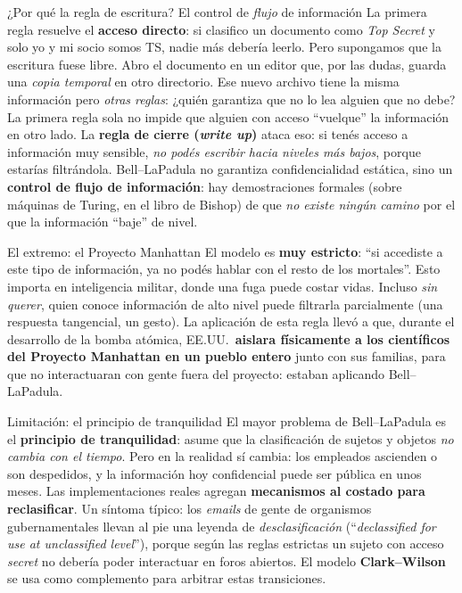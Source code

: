 \documentclass[11pt,a4paper]{article}
\begin{document}
\begin{anecbox}{¿Por qué la regla de escritura? El control de \emph{flujo} de información}
La primera regla resuelve el \textbf{acceso directo}: si clasifico un documento como
\emph{Top Secret} y solo yo y mi socio somos TS, nadie más debería leerlo. Pero supongamos
que la escritura fuese libre. Abro el documento en un editor que, por las dudas, guarda una
\emph{copia temporal} en otro directorio. Ese nuevo archivo tiene la misma información pero
\emph{otras reglas}: ¿quién garantiza que no lo lea alguien que no debe? La primera regla
sola no impide que alguien con acceso ``vuelque'' la información en otro lado. La
\textbf{regla de cierre (\emph{write up})} ataca eso: si tenés acceso a información muy
sensible, \emph{no podés escribir hacia niveles más bajos}, porque estarías filtrándola.
Bell--LaPadula no garantiza confidencialidad estática, sino un \textbf{control de flujo de
información}: hay demostraciones formales (sobre máquinas de Turing, en el libro de Bishop)
de que \emph{no existe ningún camino} por el que la información ``baje'' de nivel.
\end{anecbox}

\begin{anecbox}{El extremo: el Proyecto Manhattan}
El modelo es \textbf{muy estricto}: ``si accediste a este tipo de información, ya no podés
hablar con el resto de los mortales''. Esto importa en inteligencia militar, donde una fuga
puede costar vidas. Incluso \emph{sin querer}, quien conoce información de alto nivel puede
filtrarla parcialmente (una respuesta tangencial, un gesto). La aplicación de esta regla llevó
a que, durante el desarrollo de la bomba atómica, EE.UU.\ \textbf{aislara físicamente a los
científicos del Proyecto Manhattan en un pueblo entero} junto con sus familias, para que no
interactuaran con gente fuera del proyecto: estaban aplicando Bell--LaPadula.
\end{anecbox}

\begin{warnbox}{Limitación: el principio de tranquilidad}
El mayor problema de Bell--LaPadula es el \textbf{principio de tranquilidad}: asume que la
clasificación de sujetos y objetos \emph{no cambia con el tiempo}. Pero en la realidad sí
cambia: los empleados ascienden o son despedidos, y la información hoy confidencial puede ser
pública en unos meses. Las implementaciones reales agregan \textbf{mecanismos al costado para
reclasificar}. Un síntoma típico: los \emph{emails} de gente de organismos gubernamentales
llevan al pie una leyenda de \emph{desclasificación} (``\emph{declassified for use at
unclassified level}''), porque según las reglas estrictas un sujeto con acceso \emph{secret}
no debería poder interactuar en foros abiertos. El modelo \textbf{Clark--Wilson} se usa como
complemento para arbitrar estas transiciones.
\end{warnbox}
\end{document}
